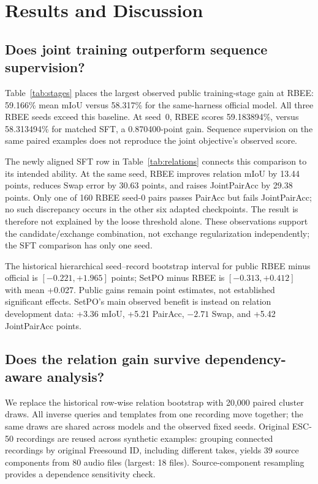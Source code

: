 \section{Results and Discussion}
\subsection{Does joint training outperform sequence supervision?}
Table~\ref{tab:stages} places the largest observed public training-stage gain at RBEE: 59.166\% mean mIoU versus 58.317\% for the same-harness official model. All three RBEE seeds exceed this baseline. At seed~0, RBEE scores 59.183894\%, versus 58.313494\% for matched SFT, a 0.870400-point gain. Sequence supervision on the same paired examples does not reproduce the joint objective's observed score.

The newly aligned SFT row in Table~\ref{tab:relations} connects this comparison to its intended ability. At the same seed, RBEE improves relation mIoU by 13.44 points, reduces Swap error by 30.63 points, and raises JointPairAcc by 29.38 points. Only one of 160 RBEE seed-0 pairs passes PairAcc but fails JointPairAcc; no such discrepancy occurs in the other six adapted checkpoints. The result is therefore not explained by the loose threshold alone. These observations support the candidate/exchange combination, not exchange regularization independently; the SFT comparison has only one seed.

The historical hierarchical seed--record bootstrap interval for public RBEE minus official is $[-0.221,+1.965]$ points; SetPO minus RBEE is $[-0.313,+0.412]$ with mean +0.027. Public gains remain point estimates, not established significant effects. SetPO's main observed benefit is instead on relation development data: +3.36 mIoU, +5.21 PairAcc, $-2.71$ Swap, and +5.42 JointPairAcc points.

\subsection{Does the relation gain survive dependency-aware analysis?}
We replace the historical row-wise relation bootstrap with 20,000 paired cluster draws. All inverse queries and templates from one recording move together; the same draws are shared across models and the observed fixed seeds. Original ESC-50 recordings are reused across synthetic examples: grouping connected recordings by original Freesound ID, including different takes, yields 39 source components from 80 audio files (largest: 18 files). Source-component resampling provides a dependence sensitivity check.

